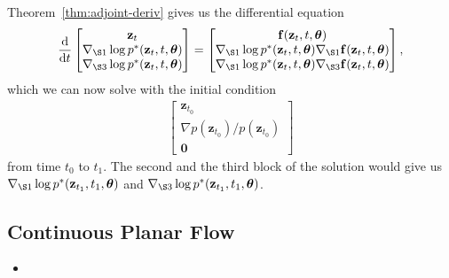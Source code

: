 \documentclass[10pt]{article}
\newcommand{\dee}{\mathrm{d}}
\newcommand{\ve}[1]{\mathbf{#1}}
\newcommand{\ves}[1]{\boldsymbol{#1}}
\begin{document}
\begin{itemize}
  Theorem~\ref{thm:adjoint-deriv} gives us the differential equation
  \begin{align*}
    \frac{\dee}{\dee t} \begin{bmatrix}
      \ve{z}_t \\
      \nabla_{\S1} \log p^*(\ve{z}_t, t, \ves{\theta}) \\
      \nabla_{\S3} \log p^*(\ve{z}_t, t, \ves{\theta})
    \end{bmatrix}
    = \begin{bmatrix}
      \ve{f}(\ve{z}_t, t, \ves{\theta}) \\
      \nabla_{\S1} \log p^*(\ve{z}_t, t, \ves{\theta}) \nabla_{\S1} \ve{f}(\ve{z}_t, t, \ves{\theta}) \\
      \nabla_{\S1} \log p^*(\ve{z}_t, t, \ves{\theta}) \nabla_{\S3} \ve{f}(\ve{z}_t, t, \ves{\theta})
    \end{bmatrix},
  \end{align*}  
  which we can now solve with the initial condition
  \begin{align*}
    \begin{bmatrix}
      \ve{z}_{t_0} \\
      \nabla p(\ve{z}_{t_0}) / p(\ve{z}_{t_0}) \\
      \ve{0}
    \end{bmatrix}
  \end{align*}
  from time $t_0$ to $t_1$. The second and the third block of the solution would give us $\nabla_{\S1} \log p^*(\ve{z}_{t_1}, t_1, \ves{\theta})$ and $\nabla_{\S3} \log p^*(\ve{z}_{t_1}, t_1, \ves{\theta})$.
\end{itemize}

\subsection{Continuous Planar Flow}

\begin{itemize}
  \item 
\end{itemize}


  
\end{document}
